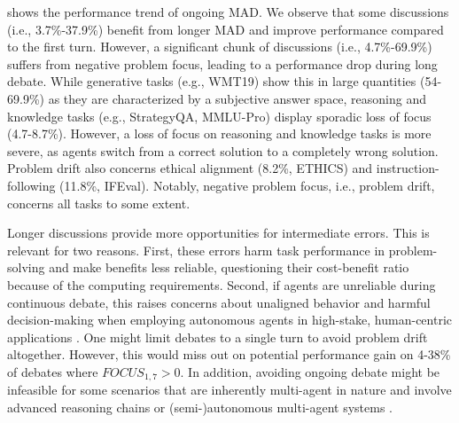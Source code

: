  shows the performance trend of ongoing MAD.
We observe that some discussions (i.e., 3.7\%-37.9\%) benefit from longer MAD and improve performance compared to the first turn.
However, a significant chunk of discussions (i.e., 4.7\%-69.9\%) suffers from negative problem focus, leading to a performance drop during long debate.
While generative tasks (e.g., WMT19) show this in large quantities (54-69.9\%) as they are characterized by a subjective answer space, reasoning and knowledge tasks (e.g., StrategyQA, MMLU-Pro) display sporadic loss of focus (4.7-8.7\%).
However, a loss of focus on reasoning and knowledge tasks is more severe, as agents switch from a correct solution to a completely wrong solution.
Problem drift also concerns ethical alignment (8.2\%, ETHICS) and instruction-following (11.8\%, IFEval).
Notably, negative problem focus, i.e., problem drift, concerns all tasks to some extent.

Longer discussions provide more opportunities for intermediate errors.
This is relevant for two reasons.
First, these errors harm task performance in problem-solving and make benefits less reliable, questioning their cost-benefit ratio because of the computing requirements.
Second, if agents are unreliable during continuous debate, this raises concerns about unaligned behavior and harmful decision-making when employing autonomous agents in high-stake, human-centric applications \citep{HuaYJC24, MukobiRRS23}.
One might limit debates to a single turn to avoid problem drift altogether.
However, this would miss out on potential performance gain on 4-38\% of debates where $FOCUS_{1,7}>0$.
In addition, avoiding ongoing debate might be infeasible for some scenarios that are inherently multi-agent in nature and involve advanced reasoning chains or (semi-)autonomous multi-agent systems \citep{Slonim2021}.

